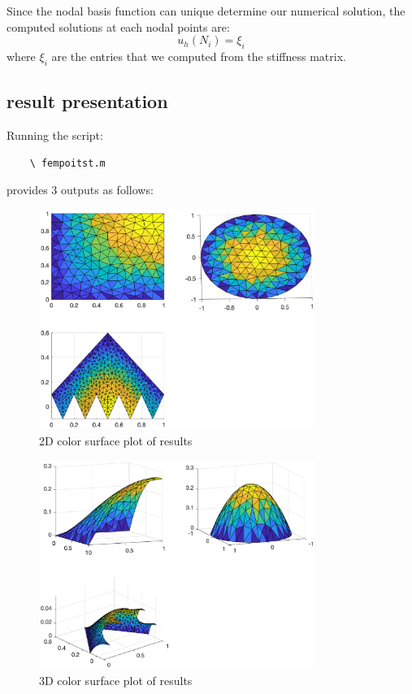 \documentclass[12pt]{article} %
\begin{document}
Since the nodal basis function can unique determine our numerical solution, the computed solutions at each nodal points are:
$$
	u_h(N_i) = \xi_i
$$ where $\xi_i$ are the entries that we computed from the stiffness matrix.

\subsection{result presentation}
Running the script:
\begin{verbatim}
	\ fempoitst.m
\end{verbatim} provides 3 outputs as follows:

\begin{figure}[h!]
 \centering
 \includegraphics[width=0.8\textwidth]{result1-2d.eps}
 \caption{2D color surface plot of results}
\end{figure}
\begin{figure}[h!]
\centering
 \includegraphics[width=0.8\textwidth]{result1-3d.eps}
 \caption{3D color surface plot of results}
\end{figure}
\end{document}
